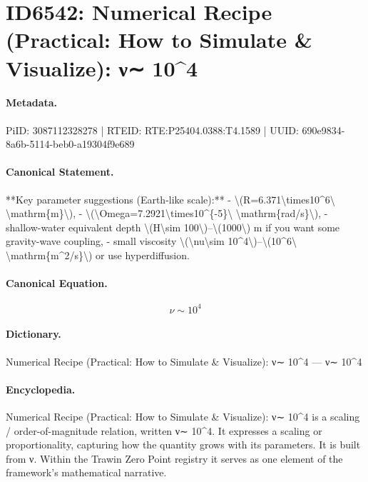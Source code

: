 \section*{ID6542: Numerical Recipe (Practical: How to Simulate \& Visualize): ν∼ 10\textasciicircum{}4}
\paragraph{Metadata.}
PiID: 3087112328278 | RTEID: RTE:P25404.0388:T4.1589 | UUID: 690e9834-8a6b-5114-beb0-a19304f9e689

\paragraph{Canonical Statement.}
**Key parameter suggestions (Earth-like scale):** - \textbackslash{}(R=6.371\textbackslash{}times10\textasciicircum{}6\textbackslash{} \textbackslash{}mathrm\{m\}\textbackslash{}), - \textbackslash{}(\textbackslash{}Omega=7.2921\textbackslash{}times10\textasciicircum{}\{-5\}\textbackslash{} \textbackslash{}mathrm\{rad/s\}\textbackslash{}), - shallow-water equivalent depth \textbackslash{}(H\textbackslash{}sim 100\textbackslash{})–\textbackslash{}(1000\textbackslash{}) m if you want some gravity-wave coupling, - small viscosity \textbackslash{}(\textbackslash{}nu\textbackslash{}sim 10\textasciicircum{}4\textbackslash{})–\textbackslash{}(10\textasciicircum{}6\textbackslash{} \textbackslash{}mathrm\{m\textasciicircum{}2/s\}\textbackslash{}) or use hyperdiffusion.

\paragraph{Canonical Equation.}
\[
\nu\sim 10^4
\]

\paragraph{Dictionary.}
Numerical Recipe (Practical: How to Simulate \& Visualize): ν∼ 10\textasciicircum{}4 — ν∼ 10\textasciicircum{}4

\paragraph{Encyclopedia.}
Numerical Recipe (Practical: How to Simulate \& Visualize): ν∼ 10\textasciicircum{}4 is a scaling / order-of-magnitude relation, written ν∼ 10\textasciicircum{}4. It expresses a scaling or proportionality, capturing how the quantity grows with its parameters. It is built from ν. Within the Trawin Zero Point registry it serves as one element of the framework's mathematical narrative.
